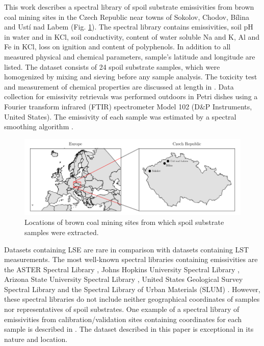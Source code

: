 This work describes a spectral library of spoil substrate emissivities from brown coal mining sites in the Czech Republic near towns of Sokolov, Chodov, Bílina and Ustí nad Labem (Fig. \ref{fig:SpoilSubstratesMap}). The spectral library contains emissivities, soil pH in water and in KCl, soil conductivity, content of water soluble Na and K, Al and Fe in KCl, loss on ignition and content of polyphenols. In addition to all measured physical and chemical parameters, sample’s latitude and longitude are listed. The dataset consists of 24 spoil substrate samples, which were homogenized by mixing and sieving before any sample analysis. The toxicity test and measurement of chemical properties are discussed at length in \cite{FK05}. Data collection for emissivity retrievals was performed outdoors in Petri dishes using a Fourier transform infrared (FTIR) spectrometer Model 102 (D\&P Instruments, United States). The emissivity of each sample was estimated by a spectral smoothing algorithm \cite{HJ98}.

\begin{figure}[!t]
\centering
\includegraphics[width=0.95\linewidth]{pics/Chapter_05/map.pdf}
\vspace{1.5 em}
\caption{Locations of brown coal mining sites from which spoil substrate samples were extracted.}
\label{fig:SpoilSubstratesMap}
\end{figure}

Datasets containing LSE are rare in comparison with datasets containing LST measurements. The most well-known spectral libraries containing emissivities are the ASTER Spectral Library \cite{BH09}, Johns Hopkins University Spectral Library \cite{SW91}, Arizona State University Spectral Library \cite{CB00}, United States Geological Survey Spectral Library \cite{CS16} and the Spectral Library of Urban Materials (SLUM) \cite{KS14}. However, these spectral libraries do not include neither geographical coordinates of samples nor representatives of spoil substrates. One example of a spectral library of emissivities from calibration/validation sites containing coordinates for each sample is described in \cite{SM09}. The dataset described in this paper is exceptional in its nature and location. 

